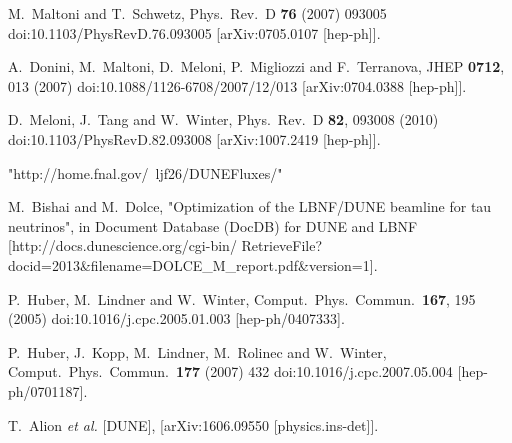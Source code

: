 \begin{thebibliography}{00}
  M.~Maltoni and T.~Schwetz,
  Phys.\ Rev.\ D {\bf 76} (2007) 093005
  doi:10.1103/PhysRevD.76.093005
  [arXiv:0705.0107 [hep-ph]].


  A.~Donini, M.~Maltoni, D.~Meloni, P.~Migliozzi and F.~Terranova,
  JHEP {\bf 0712}, 013 (2007)
  doi:10.1088/1126-6708/2007/12/013
  [arXiv:0704.0388 [hep-ph]].


  D.~Meloni, J.~Tang and W.~Winter,
  Phys.\ Rev.\ D {\bf 82}, 093008 (2010)
  doi:10.1103/PhysRevD.82.093008
  [arXiv:1007.2419 [hep-ph]].
  
  "http://home.fnal.gov/~ljf26/DUNEFluxes/"
  

  
   M.~Bishai and M.~Dolce,
   "Optimization of the LBNF/DUNE beamline for tau neutrinos", 
   in Document Database (DocDB) for DUNE and LBNF [http://docs.dunescience.org/cgi-bin/
RetrieveFile?docid=2013\&filename=DOLCE\_M\_report.pdf\&version=1].
  
  P.~Huber, M.~Lindner and W.~Winter,
  Comput.\ Phys.\ Commun.\  {\bf 167}, 195 (2005)
  doi:10.1016/j.cpc.2005.01.003
  [hep-ph/0407333].
  
  P.~Huber, J.~Kopp, M.~Lindner, M.~Rolinec and W.~Winter,
  Comput.\ Phys.\ Commun.\  {\bf 177} (2007) 432
  doi:10.1016/j.cpc.2007.05.004
  [hep-ph/0701187].
  
  
T.~Alion \textit{et al.} [DUNE],
[arXiv:1606.09550 [physics.ins-det]].


\end{thebibliography}
